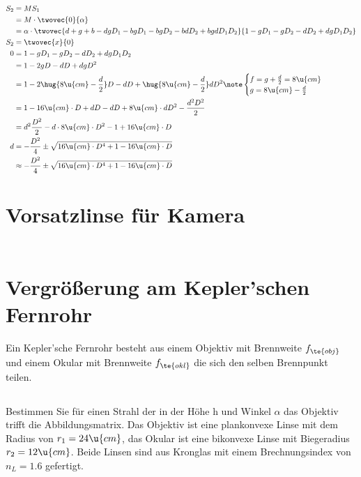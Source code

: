 \documentclass[ex]{exercise}
\begin{document}
\begin{align*}
    S_2 &= M S_1\\
    &= M \cdot \twovec{0}{\alpha}\\
    &= \alpha \cdot \twovec
    {d + g + b - d g D_1 - b g D_1 - b g D_2 - b d D_2 + b g d D_1 D_2}
    {1 - g D_1 - g D_2 - d D_2 + d g D_1 D_2}\\
    S_2 &= \twovec{x}{0}\\
    0 &= 1 - g D_1 - g D_2 - d D_2 + d g D_1 D_2\\
    &= 1 - 2 g D - d D + d g D^2\\
    &= 1 - 2 \hug{8\u{cm}- \frac d2} D - d D + \hug{8\u{cm}- \frac d2} d D^2
    \note \begin{cases}
        f = g + \frac d2 = 8\u{cm}\\
        g = 8\u{cm} - \frac d2
    \end{cases}\\
    &= 1 - 16 \u{cm}\cdot D + d D - d D + 8\u{cm}\cdot d D^2- \frac {d^2 D^2}2\\
    &= d^2 \frac {D^2}2 - d\cdot 8\u{cm}\cdot D^2 - 1 + 16 \u{cm}\cdot D\\
    d &= -\frac{D^2}{4} \pm \sqrt{16\u{cm}\cdot D^4 + 1 - 16 \u{cm}\cdot D }\\
    &\approx -\frac{D^2}{4} \pm \sqrt{16\u{cm}\cdot D^4 + 1 - 16 \u{cm}\cdot D }\\
\end{align*}

\section{Vorsatzlinse für Kamera}
\begin{align*}
\end{align*}

\section{Vergrö{\ss}erung am Kepler'schen Fernrohr}
Ein Kepler’sche Fernrohr besteht aus einem Objektiv mit Brennweite $f_{\te{obj}}$ 
und einem Okular mit Brennweite $f_{\te{okl}}$ die sich den selben Brennpunkt teilen.

\subsection{}
Bestimmen Sie für einen Strahl der in der Höhe h und Winkel \(\alpha\) das Objektiv trifft die 
Abbildungsmatrix. Das Objektiv ist eine plankonvexe Linse mit dem Radius von $r_1 = 24 \u{cm}$, 
das Okular ist eine bikonvexe Linse mit Biegeradius $r_2 = 12 \u{cm}$. 
Beide Linsen sind aus Kronglas mit einem Brechnungsindex von $n_L = 1.6$ gefertigt.
\end{document}

